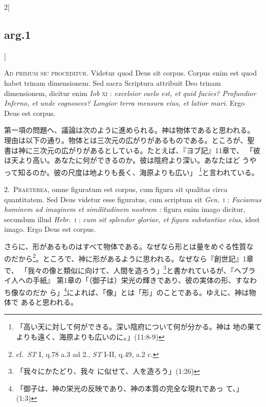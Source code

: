 \documentclass[paper=a4paper,fontsize=10pt,jafontsize=9pt,titlepage]{jlreq}
\begin{document}
\begin{paracol}{2}[\subsection{arg.1}]

{\huge A}{\scshape d primum sic proceditur}. Videtur quod Deus sit
corpus. Corpus enim est quod habet trinam dimensionem. Sed sacra
Scriptura attribuit Deo trinam dimensionem, dicitur enim {\itshape Iob}
{\scshape xi} : {\itshape excelsior caelo est, et quid facies? Profundior
Inferno, et unde cognosces? Longior terra mensura eius, et latior
mari}. Ergo Deus est corpus.

\switchcolumn

第一項の問題へ、議論は次のように進められる。神は物体であると思われる。
理由は以下の通り。物体とは三次元の広がりがあるものである。ところが、聖
書は神に三次元の広がりがあるとしている。たとえば、『ヨブ記』11章で、
「彼は天より高い。あなたに何ができるのか。彼は陰府より深い。あなたはど
うやって知るのか。彼の尺度は地よりも長く、海原よりも広い」
\footnote{「高い天に対して何ができる。深い陰府について何が分かる。神は
地の果てよりも遠く、海原よりも広いのに。」(11:8-9)}と言われている。


2.~{\scshape Praeterea}, omne figuratum est corpus, cum figura sit qualitas
circa quantitatem. Sed Deus videtur esse figuratus, cum scriptum sit
{\itshape Gen}.~{\scshape i} : {\itshape Faciamus hominem ad imaginem et
similitudinem nostram :} figura enim imago dicitur, secundum illud
{\itshape Hebr}.~{\scshape i} : {\itshape cum sit splendor gloriae, et figura
substantiae eius}, idest imago. Ergo Deus est corpus.

\switchcolumn

さらに、形があるものはすべて物体である。なぜなら形とは量をめぐる性質な
のだから\footnote{cf.~{\itshape ST} I, q.78 a.3 ad 2., {\itshape ST} I-II, q.49,
a.2 c.}。ところで、神に形があるように思われる。なぜなら『創世記』1章で、
「我々の像と類似に向けて、人間を造ろう」\footnote{「我々にかたどり、我々
に似せて、人を造ろう」(1:26)}と書かれているが、『ヘブライ人への手紙』
第1章の「（御子は）栄光の輝きであり、彼の実体の形、すなわち像なのだか
ら」\footnote{「御子は、神の栄光の反映であり、神の本質の完全な現れであっ
て、」(1:3)}によれば、「像」とは「形」のことである。ゆえに、神は物体で
あると思われる。


\end{paracol}
\end{document}
